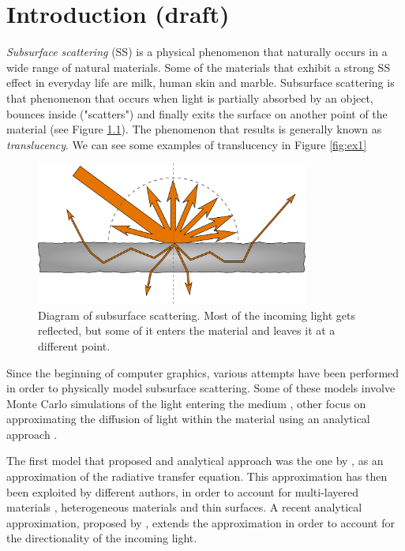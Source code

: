 \chapter{Introduction (draft)}
\emph{Subsurface scattering} (SS) is a physical phenomenon that naturally occurs in a wide range of natural materials. Some of the materials that exhibit a strong SS effect in everyday life are milk, human skin and marble. Subsurface scattering is that phenomenon that occurs when light is partially absorbed by an object, bounces inside ("scatters") and finally exits the surface on another point of the material (see Figure \ref{fig:ssdiagram}). The phenomenon that results is generally known as \emph{translucency}. We can see some examples of translucency in Figure \ref{fig:ex1}

\begin{figure}[!ht]
\centering
\includegraphics[width=0.8\textwidth]{images/diagram}
\caption{Diagram of subsurface scattering. Most of the incoming light gets reflected, but some of it enters the material and leaves it at a different point.}
\label{fig:ssdiagram}
\end{figure}

Since the beginning of computer graphics, various attempts have been performed in order to physically model subsurface scattering. Some of these models involve Monte Carlo simulations of the light entering the medium \citep{Pharr:2000:MCE:344779.344824}, other focus on approximating the diffusion of light within the material using an analytical approach \citep{Jensen:2001:PMS:383259.383319}.
 
The first model that proposed and analytical approach was the one by \cite{Jensen:2001:PMS:383259.383319}, as an approximation of the radiative transfer equation. This approximation has then been exploited by different authors, in order to account for multi-layered materials \citep{Donner:2005:LDM:1186822.1073308}, heterogeneous materials \citep{journals/cgf/WangWHSYG10} and thin surfaces\citep{journals/cgf/WangWHSYG10}. A recent analytical approximation, proposed by \cite{IMM2013-06646}, extends the approximation in order to account for the directionality of the incoming light. 

